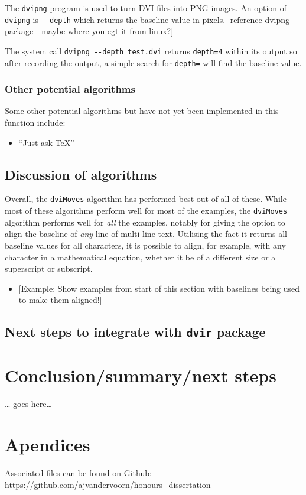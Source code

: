 \documentclass[]{article}
\providecommand{\tightlist}{%
  \setlength{\itemsep}{0pt}\setlength{\parskip}{0pt}}
\begin{document}
The \texttt{dvipng} program is used to turn DVI files into PNG images.
An option of \texttt{dvipng} is \texttt{-\/-depth} which returns the
baseline value in pixels. {[}reference dvipng package - maybe where you
egt it from linux?{]}

The system call \texttt{dvipng\ -\/-depth\ test.dvi} returns
\texttt{depth=4} within its output so after recording the output, a
simple search for \texttt{depth=} will find the baseline value.

\subsubsection{Other potential
algorithms}\label{other-potential-algorithms}

Some other potential algorithms but have not yet been implemented in
this function include:

\begin{itemize}
\tightlist
\item
  ``Just ask \TeX{}''
\end{itemize}

\subsection{Discussion of algorithms}\label{discussion-of-algorithms}

Overall, the \texttt{dviMoves} algorithm has performed best out of all
of these. While most of these algorithms perform well for most of the
examples, the \texttt{dviMoves} algorithm performs well for \emph{all}
the examples, notably for giving the option to align the baseline of
\emph{any} line of multi-line text. Utilising the fact it returns all
baseline values for all characters, it is possible to align, for
example, with any character in a mathematical equation, whether it be of
a different size or a superscript or subscript.

\begin{itemize}
\tightlist
\item
  {[}Example: Show examples from start of this section with baselines
  being used to make them aligned!{]}
\end{itemize}

\subsection{\texorpdfstring{Next steps to integrate with \texttt{dvir}
package}{Next steps to integrate with dvir package}}\label{next-steps-to-integrate-with-dvir-package}

\newpage{}

\section{Conclusion/summary/next
steps}\label{conclusionsummarynext-steps}

\ldots{} goes here\ldots{}

\newpage{}

\section{Apendices}\label{apendices}

Associated files can be found on Github:
\url{https://github.com/ajvandervoorn/honours_dissertation}
\end{document}
